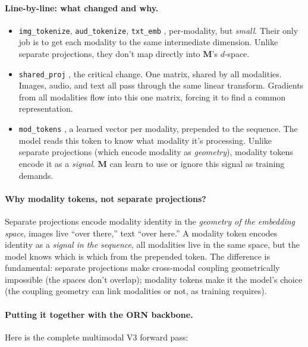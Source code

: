 \documentclass[11pt, a4paper]{article}
\newcommand{\M}{\mathbf{M}}
\theoremstyle{remark}
\begin{document}
\paragraph{Line-by-line: what changed and why.}
\begin{itemize}[nosep]
    \item \texttt{img\_tokenize}, \texttt{aud\_tokenize}, \texttt{txt\_emb} ,  per-modality, but \emph{small}.
    Their only job is to get each modality to the same intermediate dimension.
    Unlike separate projections, they don't map directly into $\M$'s $d$-space.
    \item \texttt{shared\_proj} ,  the critical change.
    One matrix, shared by all modalities.
    Images, audio, and text all pass through the same linear transform.
    Gradients from all modalities flow into this one matrix, forcing it to find a common representation.
    \item \texttt{mod\_tokens} ,  a learned vector per modality, prepended to the sequence.
    The model reads this token to know what modality it's processing.
    Unlike separate projections (which encode modality as \emph{geometry}), modality tokens encode it as a \emph{signal}.
    $\M$ can learn to use or ignore this signal as training demands.
\end{itemize}

\paragraph{Why modality tokens, not separate projections?}
Separate projections encode modality identity in the \emph{geometry of the embedding space}, images live ``over there,'' text ``over here.''
A modality token encodes identity as a \emph{signal in the sequence}, all modalities live in the same space, but the model knows which is which from the prepended token.
The difference is fundamental: separate projections make cross-modal coupling geometrically impossible (the spaces don't overlap); modality tokens make it the model's choice (the coupling geometry can link modalities or not, as training requires).

\paragraph{Putting it together with the ORN backbone.}
Here is the complete multimodal V3 forward pass:
\end{document}
